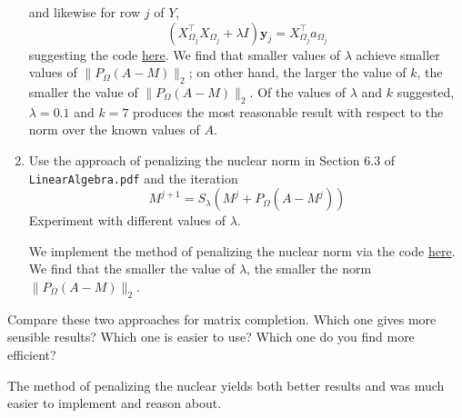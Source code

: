 \documentclass{../../../kin_math}
\begin{document}
\begin{questions}
\begin{enumerate}
\begin{solution}
\begin{equation*}
      \end{equation*}
      and likewise for row $j$ of $Y$,
      \begin{equation*}
        (X_{\Omega_j}^\top X_{\Omega_j} + \lambda I) \textbf{y}_j = X_{\Omega_j}^\top a_{\Omega_j}
      \end{equation*}
      suggesting the code \href{https://github.com/elijahkin/school/blob/main/umd/amsc660/hw7/hw7.ipynb}{here}. We find that smaller values of $\lambda$ achieve smaller values of $\lVert P_\Omega(A - M) \rVert_2$; on other hand, the larger the value of $k$, the smaller the value of $\lVert P_\Omega(A - M) \rVert_2$. Of the values of $\lambda$ and $k$ suggested, $\lambda = 0.1$ and $k = 7$ produces the most reasonable result with respect to the norm over the known values of $A$.
    \end{solution}
    \item Use the approach of penalizing the nuclear norm in Section 6.3 of \texttt{LinearAlgebra.pdf} and the iteration
    \begin{equation*}
      M^{j + 1} = S_\lambda(M^j + P_\Omega(A - M^j))
    \end{equation*}
    Experiment with different values of $\lambda$.
    \begin{solution}
      We implement the method of penalizing the nuclear norm via the code \href{https://github.com/elijahkin/school/blob/main/umd/amsc660/hw7/hw7.ipynb}{here}. We find that the smaller the value of $\lambda$, the smaller the norm $\lVert P_\Omega(A - M) \rVert_2$.
    \end{solution}
  \end{enumerate}
  Compare these two approaches for matrix completion. Which one gives more sensible results? Which one is easier to use? Which one do you find more efficient?
  \begin{solution}
    The method of penalizing the nuclear yields both better results and was much easier to implement and reason about.
  \end{solution}


\end{questions}
\end{document}
